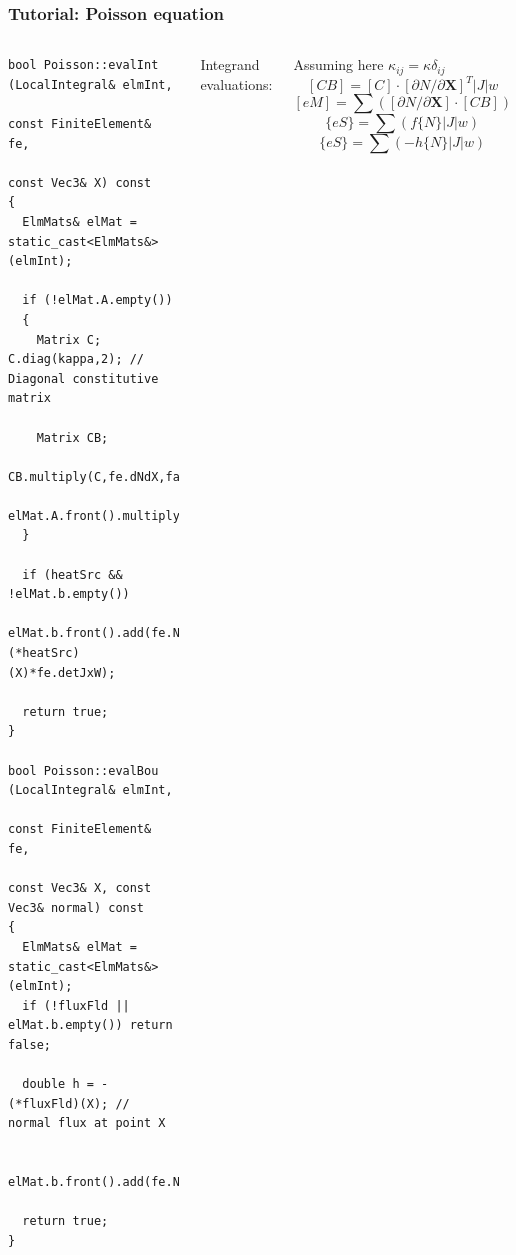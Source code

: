\documentclass{beamer}
\begin{document}
\begin{frame}[fragile] %
 \frametitle{Tutorial: Poisson equation}

 \begin{columns}[c]
  \tiny\begin{verbatim}
bool Poisson::evalInt (LocalIntegral& elmInt,
                       const FiniteElement& fe,
                       const Vec3& X) const
{
  ElmMats& elMat = static_cast<ElmMats&>(elmInt);

  if (!elMat.A.empty())
  {
    Matrix C; C.diag(kappa,2); // Diagonal constitutive matrix

    Matrix CB;
    CB.multiply(C,fe.dNdX,false,true).multiply(fe.detJxW);
    elMat.A.front().multiply(fe.dNdX,CB,false,false,true);
  }

  if (heatSrc && !elMat.b.empty())
    elMat.b.front().add(fe.N,(*heatSrc)(X)*fe.detJxW);

  return true;
}

bool Poisson::evalBou (LocalIntegral& elmInt,
                       const FiniteElement& fe,
                       const Vec3& X, const Vec3& normal) const
{
  ElmMats& elMat = static_cast<ElmMats&>(elmInt);
  if (!fluxFld || elMat.b.empty()) return false;

  double h = -(*fluxFld)(X); // normal flux at point X

  elMat.b.front().add(fe.N,h*fe.detJxW);

  return true;
}
  \end{verbatim}
  \small
  Integrand evaluations:

  Assuming here $\kappa_{ij} = \kappa\delta_{ij}$
  $$
  [CB] = [C]\cdot[\partial N/\partial\bm{X}]^T|J|w
  $$
  $$
  [eM] = \sum\left([\partial N/\partial\bm{X}]\cdot[CB]\right)
  $$
  $$
  \{eS\} = \sum\left(f\{N\}|J|w\right)
  $$
  \vskip15mm
  $$
  \{eS\} = \sum\left(-h\{N\}|J|w \right)
  $$
 \end{columns}
\end{frame}
\end{document}
